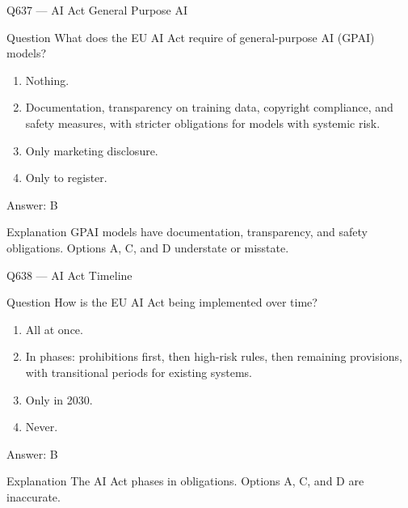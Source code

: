 \documentclass[aspectratio=169,8pt]{beamer}
\begin{document}
	\begin{frame}{Q637 --- AI Act General Purpose AI}
		\begin{block}{Question}
			What does the EU AI Act require of general-purpose AI (GPAI) models?
			\begin{enumerate}
				\item Nothing.
				\item Documentation, transparency on training data, copyright compliance, and safety measures, with stricter obligations for models with systemic risk.
				\item Only marketing disclosure.
				\item Only to register.
			\end{enumerate}
		\end{block}
		\begin{exampleblock}{Answer: B}\end{exampleblock}
		\begin{block}{Explanation}
			GPAI models have documentation, transparency, and safety obligations. Options A, C, and D understate or misstate.
		\end{block}
	\end{frame}
	
	\begin{frame}{Q638 --- AI Act Timeline}
		\begin{block}{Question}
			How is the EU AI Act being implemented over time?
			\begin{enumerate}
				\item All at once.
				\item In phases: prohibitions first, then high-risk rules, then remaining provisions, with transitional periods for existing systems.
				\item Only in 2030.
				\item Never.
			\end{enumerate}
		\end{block}
		\begin{exampleblock}{Answer: B}\end{exampleblock}
		\begin{block}{Explanation}
			The AI Act phases in obligations. Options A, C, and D are inaccurate.
		\end{block}
	\end{frame}
	
\end{document}
